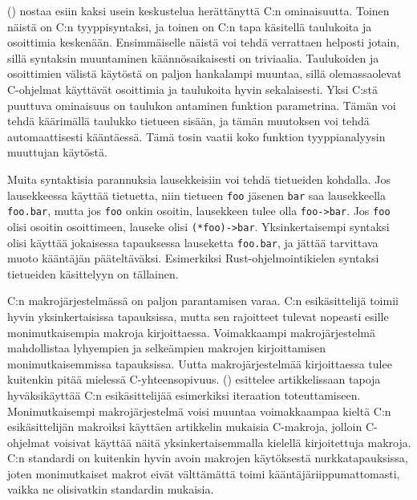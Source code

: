 

\citeauthor{chistory} (\citeyear{chistory}) nostaa esiin kaksi usein
keskustelua herättänyttä C:n ominaisuutta. Toinen näistä on C:n tyyppisyntaksi,
ja toinen on C:n tapa käsitellä taulukoita ja osoittimia keskenään.
Ensimmäiselle näistä voi tehdä verrattaen helposti jotain, sillä syntaksin
muuntaminen käännösaikaisesti on triviaalia. Taulukoiden ja osoittimien välistä
käytöstä on paljon hankalampi muuntaa, sillä olemassaolevat C-ohjelmat
käyttävät osoittimia ja taulukoita hyvin sekalaisesti. Yksi C:stä puuttuva
ominaisuus on taulukon antaminen funktion parametrina. Tämän voi tehdä
käärimällä taulukko tietueen sisään, ja tämän muutoksen voi tehdä
automaattisesti kääntäessä. Tämä tosin vaatii koko funktion tyyppianalyysin
muuttujan käytöstä.

Muita syntaktisia parannuksia lausekkeisiin voi tehdä tietueiden kohdalla. Jos
lausekkeessa käyttää tietuetta, niin tietueen \texttt{foo} jäsenen \texttt{bar}
saa lausekkeella \texttt{foo.bar}, mutta jos \texttt{foo} onkin osoitin,
lausekkeen tulee olla \texttt{foo->bar}. Jos \texttt{foo} olisi osoitin
osoittimeen, lauseke olisi \texttt{(*foo)->bar}. Yksinkertaisempi syntaksi
olisi käyttää jokaisessa tapauksessa lauseketta \texttt{foo.bar}, ja jättää
tarvittava muoto kääntäjän pääteltäväksi. Esimerkiksi Rust-ohjelmointikielen
syntaksi tietueiden käsittelyyn on tällainen.

C:n makrojärjestelmässä on paljon parantamisen varaa. C:n esikäsittelijä toimii
hyvin yksinkertaisissa tapauksissa, mutta sen rajoitteet tulevat nopeasti
esille monimutkaisempia makroja kirjoittaessa. Voimakkaampi makrojärjestelmä
mahdollistaa lyhyempien ja selkeämpien makrojen kirjoittamisen
monimutkaisemmissa tapauksissa. Uutta makrojärjestelmää kirjoittaessa tulee
kuitenkin pitää mielessä C-yhteensopivuus. \citeauthor{cabuse}
(\citeyear{cabuse}) esittelee artikkelissaan tapoja hyväksikäyttää C:n
esikäsittelijää esimerkiksi iteraation toteuttamiseen. Monimutkaisempi
makrojärjestelmä voisi muuntaa voimakkaampaa kieltä C:n esikäsittelijän
makroiksi käyttäen artikkelin mukaisia C-makroja, jolloin C-ohjelmat voisivat
käyttää näitä yksinkertaisemmalla kielellä kirjoitettuja makroja. C:n standardi
on kuitenkin hyvin avoin makrojen käytöksestä nurkkatapauksissa, joten
monimutkaiset makrot eivät välttämättä toimi kääntäjäriippumattomasti, vaikka
ne olisivatkin standardin mukaisia.

